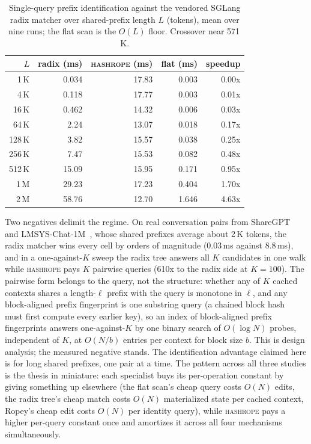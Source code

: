 \documentclass[10pt,conference]{IEEEtran}
\newcommand{\hr}{\textsc{hashrope}}
\newcommand{\ms}{\,ms}
\begin{document}
\begin{table}[t]
\caption{Single-query prefix identification against the vendored
SGLang radix matcher over shared-prefix length $L$ (tokens), mean over
nine runs; the flat scan is the $O(L)$ floor. Crossover near 571\,K.}
\label{tab:radix}
\centering
\footnotesize
\begin{tabular}{@{}rrrrr@{}}
\toprule
$L$ & radix (ms) & \hr{} (ms) & flat (ms) & speedup \\
\midrule
1\,K   & 0.034  & 17.83 & 0.003 & 0.00x \\
4\,K   & 0.118  & 17.77 & 0.003 & 0.01x \\
16\,K  & 0.462  & 14.32 & 0.006 & 0.03x \\
64\,K  & 2.24   & 13.07 & 0.018 & 0.17x \\
128\,K & 3.82   & 15.57 & 0.038 & 0.25x \\
256\,K & 7.47   & 15.53 & 0.082 & 0.48x \\
512\,K & 15.09  & 15.95 & 0.171 & 0.95x \\
1\,M   & 29.23  & 17.23 & 0.404 & 1.70x \\
2\,M   & 58.76  & 12.70 & 1.646 & 4.63x \\
\bottomrule
\end{tabular}
\end{table}

Two negatives delimit the regime. On real
conversation pairs from ShareGPT~\cite{sharegpt} and
LMSYS-Chat-1M~\cite{zheng2024lmsyschat}, whose shared prefixes average
about 2\,K tokens, the radix matcher wins every cell by orders of
magnitude (0.03\ms{} against 8.8\ms{}), and in a one-against-$K$ sweep
the radix tree answers all $K$ candidates in one walk while \hr{} pays
$K$ pairwise queries (610x to the radix side at $K = 100$). The
pairwise form belongs to the query, not the structure: whether any of
$K$ cached contexts shares a length-$\ell$ prefix with the query is
monotone in $\ell$, and any block-aligned prefix fingerprint is one
substring query (a chained block hash~\cite{vllm2025apc} must first
compute every earlier key), so an index of block-aligned prefix
fingerprints answers one-against-$K$ by one binary search of
$O(\log N)$ probes, independent of $K$, at $O(N/b)$ entries per
context for block size $b$. This is design analysis; the measured
negative stands. The identification advantage claimed here is for
long shared prefixes, one pair at a time. The pattern
across all three studies is the thesis in miniature: each specialist
buys its per-operation constant by giving something up elsewhere (the
flat scan's cheap query costs $O(N)$ edits, the radix tree's cheap
match costs $O(N)$ materialized state per cached context, Ropey's
cheap edit costs $O(N)$ per identity query), while \hr{} pays a
higher per-query constant once and amortizes it across all four
mechanisms simultaneously.
\end{document}
